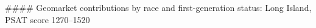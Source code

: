 #### Geomarket contributions by race and first-generation status: Long Island, PSAT score 1270–1520
